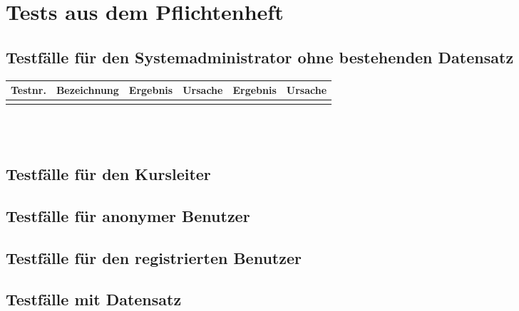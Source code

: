 \chapter{Tests aus dem Pflichtenheft}

\begin{landscape}
	\section{Testfälle für den Systemadministrator ohne bestehenden Datensatz}	
		\begin{tabular}{|p{2.0cm} |p{4.0cm}|p{4.0cm}|p{4.0cm}|p{4.0cm}|p{4.0cm}|}
			\hline \textbf{Testnr.} & \textbf{Bezeichnung} & \textbf{Ergebnis} & \textbf{Ursache} & \textbf{Ergebnis} & \textbf{Ursache} \\ 
      	    \hline                  &                      &                   &                  &                   &                  \\ 
			\hline 
		\end{tabular} \ \\
		\ \\
	\section{Testfälle für den Kursleiter}
		
	\section{Testfälle für anonymer Benutzer}
	
	\section{Testfälle für den registrierten Benutzer}
	
	\section{Testfälle mit Datensatz}	
	
	
\end{landscape}